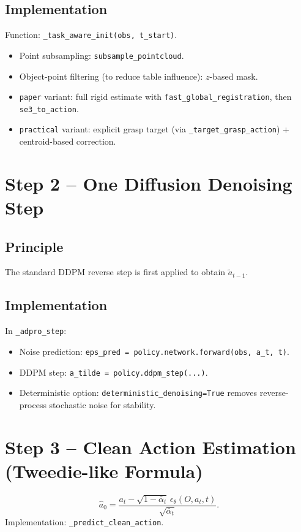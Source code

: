 \documentclass[11pt,a4paper]{article}
\begin{document}
\subsection{Implementation}
Function: \texttt{\_task\_aware\_init(obs, t\_start)}.
\begin{itemize}
\item Point subsampling: \texttt{subsample\_pointcloud}.
\item Object-point filtering (to reduce table influence): $z$-based mask.
\item \texttt{paper} variant: full rigid estimate with \texttt{fast\_global\_registration}, then \texttt{se3\_to\_action}.
\item \texttt{practical} variant: explicit grasp target (via \texttt{\_target\_grasp\_action}) + centroid-based correction.
\end{itemize}

\section{Step 2 -- One Diffusion Denoising Step}
\subsection{Principle}
The standard DDPM reverse step is first applied to obtain $\tilde a_{t-1}$.

\subsection{Implementation}
In \texttt{\_adpro\_step}:
\begin{itemize}
\item Noise prediction: \texttt{eps\_pred = policy.network.forward(obs, a\_t, t)}.
\item DDPM step: \texttt{a\_tilde = policy.ddpm\_step(...)}.
\item Deterministic option: \texttt{deterministic\_denoising=True} removes reverse-process stochastic noise for stability.
\end{itemize}

\section{Step 3 -- Clean Action Estimation (Tweedie-like Formula)}
\begin{equation}
\hat a_0 = \frac{a_t - \sqrt{1-\bar\alpha_t}\,\epsilon_\theta(O,a_t,t)}{\sqrt{\bar\alpha_t}}.
\end{equation}
Implementation: \texttt{\_predict\_clean\_action}.
\end{document}
